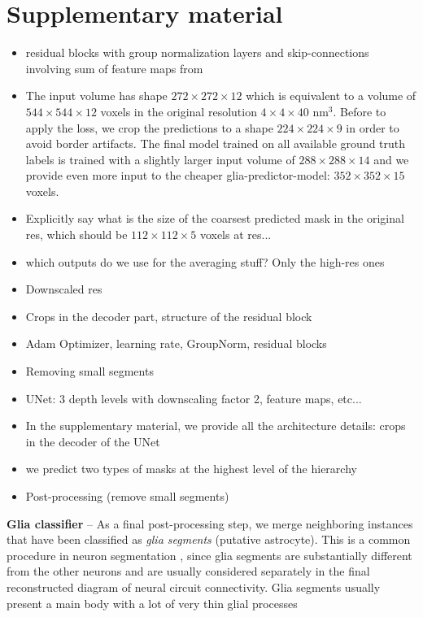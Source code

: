 
\section{Supplementary material}
\begin{itemize}
\item residual blocks with group normalization layers and skip-connections involving sum of feature maps from 
\item The input volume has shape $272 \times 272\times12$ which is equivalent to a volume of $544\times 544\times 12$ voxels in the original resolution $4\times 4\times 40$ nm$^3$. Before to apply the loss, we crop the predictions to a shape $224\times 224\times 9$ in order to avoid border artifacts. 
The final model trained on all available ground truth labels is trained with a slightly larger input volume of $288\times 288\times 14$ and we provide even more input to the cheaper glia-predictor-model: $352\times 352\times 15$ voxels. 
\item Explicitly say what is the size of the coarsest predicted mask in the original res, which should be $112 \times 112 \times 5$ voxels at res...
\item which outputs do we use for the averaging stuff? Only the high-res ones
\item Downscaled res
\item Crops in the decoder part, structure of the residual block
\item Adam Optimizer, learning rate, GroupNorm, residual blocks
\item Removing small segments
\item UNet: 3 depth levels with downscaling factor 2, feature maps, etc...
\item In the supplementary material, we provide all the architecture details: crops in the decoder of the UNet
\item we predict two types of \maskname masks at the highest level of the hierarchy
\item Post-processing (remove small segments)
\end{itemize}

\textbf{Glia classifier} -- As a final post-processing step, we merge neighboring instances that have been classified as \emph{glia segments} (putative astrocyte). This is a common procedure in neuron segmentation \cite{lee2019learning}, since glia segments are substantially different from the other neurons and are usually considered separately in the final reconstructed diagram of neural circuit connectivity. Glia segments usually present a main body with a lot of very thin glial processes

